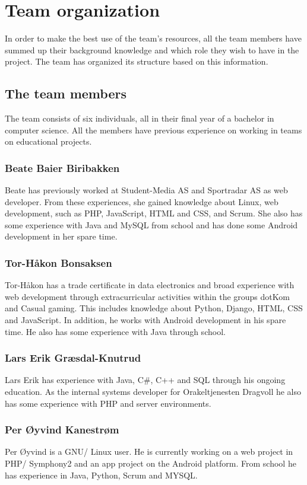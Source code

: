 \section{Team organization}
In order to make the best use of the team's resources, all the team members have summed up their background knowledge and which role they wish to have in the project. The team has organized its structure based on this information.

\subsection{The team members}
The team consists of six individuals, all in their final year of a bachelor in computer science. All the members have previous experience on working in teams on educational projects.

\subsubsection{Beate Baier Biribakken}
Beate has previously worked at Student-Media AS\cite{studentmedia} and Sportradar AS\cite{sportradar} as web developer. From these experiences, she gained knowledge about Linux, web development, such as PHP, JavaScript, HTML and CSS, and Scrum. She also has some experience with Java and MySQL from school and has done some Android development in her spare time.

\subsubsection{Tor-Håkon Bonsaksen}
Tor-Håkon has a trade certificate in data electronics and broad experience with web development through extracurricular activities within the groups dotKom\cite{dotkom} and Casual gaming\cite{casualgaming}. This includes knowledge about Python, Django, HTML, CSS and JavaScript. In addition, he works with Android development in his spare time. He also has some experience with Java through school.

\subsubsection{Lars Erik Græsdal-Knutrud}
Lars Erik has experience with Java, C\#, C++ and SQL through his ongoing education. As the internal systems developer for Orakeltjenesten Dragvoll\cite{orakeltjenesten} he also has some experience with PHP and server environments. 

\subsubsection{Per Øyvind Kanestrøm}
Per Øyvind is a GNU/ Linux user. He is currently working on a web project in PHP/ Symphony2 and an app project on the Android platform. From school he has experience in Java, Python, Scrum and MYSQL.

